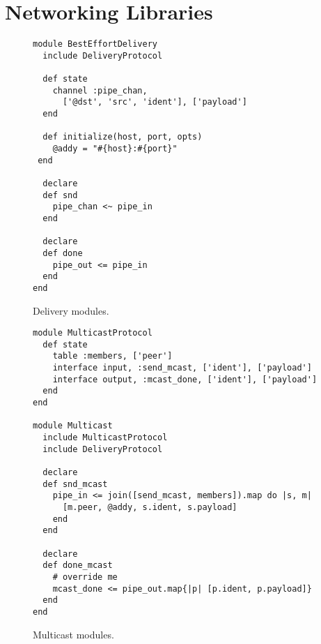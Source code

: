 \section{Networking Libraries}
\label{app:network-code}

\begin{figure}[t]
\begin{scriptsize}
\begin{lstlisting}
module BestEffortDelivery
  include DeliveryProtocol

  def state
    channel :pipe_chan,
      ['@dst', 'src', 'ident'], ['payload']
  end

  def initialize(host, port, opts)
    @addy = "#{host}:#{port}"
 end

  declare
  def snd
    pipe_chan <~ pipe_in
  end

  declare
  def done
    pipe_out <= pipe_in
  end
end
\end{lstlisting}
\centering
\vspace{-10pt}
\caption{Delivery modules.}
\label{fig:delivery-impl}
\end{scriptsize}
\vspace{-2pt}
\end{figure}


\begin{figure}[t]
\begin{scriptsize}
\begin{lstlisting}
module MulticastProtocol
  def state
    table :members, ['peer']
    interface input, :send_mcast, ['ident'], ['payload']
    interface output, :mcast_done, ['ident'], ['payload']
  end
end

module Multicast
  include MulticastProtocol
  include DeliveryProtocol

  declare
  def snd_mcast
    pipe_in <= join([send_mcast, members]).map do |s, m|
      [m.peer, @addy, s.ident, s.payload]
    end
  end

  declare
  def done_mcast
    # override me
    mcast_done <= pipe_out.map{|p| [p.ident, p.payload]}
  end
end
\end{lstlisting}
\centering
\vspace{-10pt}
\caption{Multicast modules.}
\label{fig:multicast-impl}
\end{scriptsize}
\vspace{-2pt}
\end{figure}

